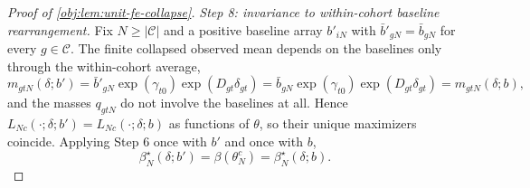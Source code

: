 \begin{proof}[Proof of \cref{obj:lem:unit-fe-collapse}]
\textit{Step 8: invariance to within-cohort baseline rearrangement.} Fix \(N\ge|\mathcal C|\) and a positive baseline array \(b'_{iN}\) with \(\bar b'_{gN}=\bar b_{gN}\) for every \(g\in\mathcal C\). The finite collapsed observed mean depends on the baselines only through the within-cohort average,
\[
m_{gtN}(\delta;b')=\bar b'_{gN}\exp(\gamma_{t0})\exp(D_{gt}\delta_{gt})
=\bar b_{gN}\exp(\gamma_{t0})\exp(D_{gt}\delta_{gt})=m_{gtN}(\delta;b),
\]
and the masses \(q_{gtN}\) do not involve the baselines at all. Hence \(L_{Nc}(\cdot;\delta;b')=L_{Nc}(\cdot;\delta;b)\) as functions of \(\theta\), so their unique maximizers coincide. Applying Step 6 once with \(b'\) and once with \(b\),
\[
\beta_N^\star(\delta;b')=\beta(\theta_N^c)=\beta_N^\star(\delta;b).
\]
\end{proof}


